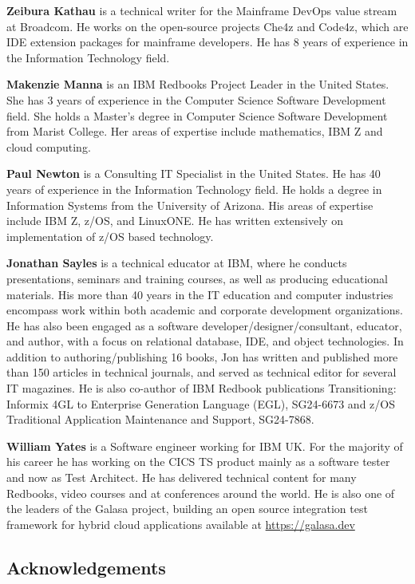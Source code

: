 \textbf{Zeibura Kathau} is a technical writer for the Mainframe DevOps
value stream at Broadcom. He works on the open-source projects Che4z and 
Code4z, which are IDE extension packages for mainframe developers. He has 
8 years of experience in the Information Technology field.

\textbf{Makenzie Manna} is an IBM Redbooks Project Leader in the United
States. She has 3 years of experience in the Computer Science Software
Development field. She holds a Master's degree in Computer Science
Software Development from Marist College. Her areas of expertise include
mathematics, IBM Z and cloud computing.

\textbf{Paul Newton} is a Consulting IT Specialist in the United States.
He has 40 years of experience in the Information Technology field. He
holds a degree in Information Systems from the University of Arizona.
His areas of expertise include IBM Z, z/OS, and LinuxONE. He has written
extensively on implementation of z/OS based technology.

\textbf{Jonathan Sayles} is a technical educator at IBM, where he
conducts presentations, seminars and training courses, as well as
producing educational materials. His more than 40 years in the IT
education and computer industries encompass work within both academic
and corporate development organizations. He has also been engaged as a
software developer/designer/consultant, educator, and author, with a
focus on relational database, IDE, and object technologies. In addition
to authoring/publishing 16 books, Jon has written and published more
than 150 articles in technical journals, and served as technical editor
for several IT magazines. He is also co-author of IBM Redbook
publications Transitioning: Informix 4GL to Enterprise Generation
Language (EGL), SG24-6673 and z/OS Traditional Application Maintenance
and Support, SG24-7868.

\textbf{William Yates} is a Software engineer working for IBM UK. For
the majority of his career he has working on the CICS TS product mainly
as a software tester and now as Test Architect. He has delivered
technical content for many Redbooks, video courses and at conferences
around the world. He is also one of the leaders of the Galasa project,
building an open source integration test framework for hybrid cloud
applications available at \href{https://galasa.dev/}{https://galasa.dev}

\hypertarget{acknowledgements}{%
\subsection*{Acknowledgements}\label{acknowledgements}}

